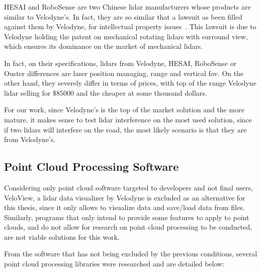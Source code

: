 HESAI and RoboSense are two Chinese \ac{lidar} manufacturers whose products are similar to Velodyne's. In fact, they are so similar that a lawsuit as been filled against them by Velodyne, for intellectual property issues~\cite{VelodyneLawsuit}. This lawsuit is due to Velodyne holding the patent on mechanical rotating \acp{lidar} with surround view\cite{Hall2011}, which ensures its dominance on the market of mechanical \acp{lidar}. 

In fact, on their specifications, \acp{lidar} from Velodyne, HESAI, RoboSense or Ouster differences are \ac{laser} position managing, range and vertical \ac{fov}. On the other hand, they severely differ in terms of prices, with top of the range Velodyne \ac{lidar} selling for $\$85000$ and the cheaper at some thousand dollars. 

For our work, since Velodyne's is the top of the market solution and the more mature, it makes sense to test \ac{lidar} interference on the most used solution, since if two \acp{lidar} will interfere on the road, the most likely scenario is that they are from Velodyne's.

\subsection{Point Cloud Processing Software}
Considering only point cloud software targeted to developers and not final users, VeloView\texttrademark, a \ac{lidar} data visualizer by Velodyne is excluded as an alternative for this thesis, since it only allows to visualize data and save/load data from files. Similarly, programs that only intend to provide some features to apply to point clouds, and do not allow for research on point cloud processing to be conducted, are not viable solutions for this work. 

From the software that has not being excluded by the previous conditions, several point cloud processing libraries were researched and are detailed below:

